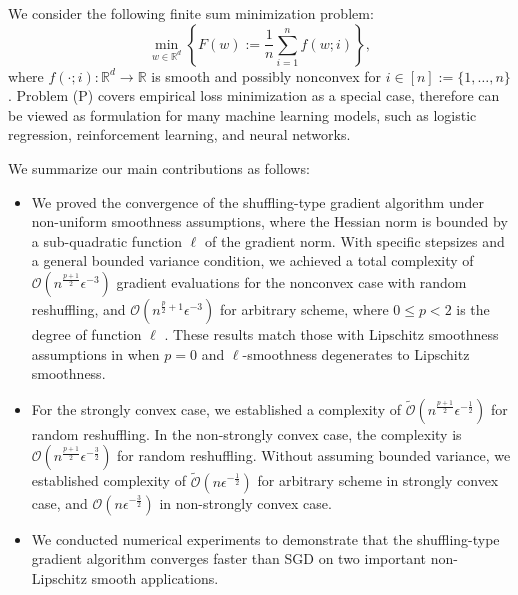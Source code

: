 \documentclass{article} %
\theoremstyle{plain}
\theoremstyle{definition}
\theoremstyle{remark}
\begin{document}

We consider the following finite sum minimization problem:
\begin{equation}
\min_{w \in \mathbb{R}^d} \left\{ F(w) := \frac{1}{n} \sum_{i=1}^n f(w;i) \right\}, \tag{P}
\end{equation}
where $f(\cdot;i) : \mathbb{R}^d \rightarrow \mathbb{R}$ is smooth and possibly nonconvex for $i \in [n] := \{1, \ldots, n\}$. Problem (P) covers empirical loss minimization as a special case, therefore can be viewed as formulation for many machine learning models, such as logistic regression, reinforcement learning, and neural networks.

We summarize our main contributions as follows:

\begin{itemize}
    \item We proved the convergence of the shuffling-type gradient algorithm under non-uniform smoothness assumptions, where the Hessian norm is bounded by a sub-quadratic function $\ell$ of the gradient norm. With specific stepsizes and a general bounded variance condition, we achieved a total complexity of $\mathcal{O}(n^\frac{p+1}{2}\epsilon^{-3})$ gradient evaluations for the nonconvex case with random reshuffling, and $\mathcal{O}(n^{\frac{p}{2}+1}\epsilon^{-3})$ for arbitrary scheme, where $0\leq p<2$ is the degree of function $\ell$ . These results match those with Lipschitz smoothness assumptions in \citet{nguyen2021unified} when $p=0$ and $\ell$-smoothness degenerates to Lipschitz smoothness.
    \item For the strongly convex case, we established a complexity of $\widetilde{\mathcal{O}}(n^\frac{p+1}{2}\epsilon^{-\frac{1}{2}})$ for random reshuffling. In the non-strongly convex case, the complexity is $\mathcal{O}(n^\frac{p+1}{2}\epsilon^{-\frac{3}{2}})$ for random reshuffling. Without assuming bounded variance, we established complexity of $\widetilde{\mathcal{O}}(n\epsilon^{-\frac{1}{2}})$ for arbitrary scheme in strongly convex case, and $\mathcal{O}(n\epsilon^{-\frac{3}{2}})$ in non-strongly convex case.
    \item We conducted numerical experiments to demonstrate that the shuffling-type gradient algorithm converges faster than SGD on two important non-Lipschitz smooth applications.
\end{itemize}
\end{document}
